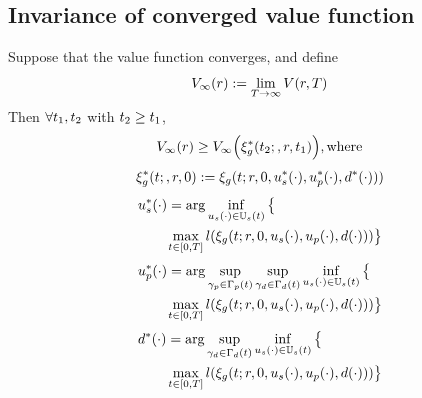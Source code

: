 \subsection{Invariance of converged value function}
 \begin{prop}
   \label{prop:main}
   Suppose that the value function converges, and define
      \begin{equation}
      \label{eq:conv_valfunc}
      V_\infty(r) := \lim_{T\rightarrow\infty}V(r, T)
      \end{equation}
   Then $\forall t_1, t_2$ with $t_2 \ge t_1$,
   \begin{equation}
   \label{eq:invariant}
   V_\infty(r) \ge V_\infty\Big(\xi_g^*(t_2;, r, t_1)\Big), \text{where}
   \end{equation}
   \begin{equation}
   \begin{aligned}
   \xi_g^*(t;, r, 0) := \xi_g(t; r, 0, u_s^*(\cdot), u_p^*(\cdot), d^*(\cdot))) \\
   \end{aligned}
   \end{equation}
   \begin{equation}
   \begin{aligned}
   &u_s^*(\cdot) = \arg \inf_{u_s(\cdot)\in\mathbb{U}_s(t)}\big\{\\
   & \qquad \max_{t \in [0, T]} l(\xi_g(t; r, 0, u_s(\cdot), u_p(\cdot), d(\cdot))) \big\}\\
    \end{aligned}
   \end{equation}
   \begin{equation}
   \begin{aligned}
   & u_p^*(\cdot) = \arg \sup_{\gamma_{p} \in \Gamma_p(t)} \sup_{\gamma_{d} \in \Gamma_d(t)} \inf_{u_s(\cdot) \in \mathbb{U}_s(t)} \big\{ \\
   & \qquad \max_{t \in [0, T]} l(\xi_g(t; r, 0, u_s(\cdot), u_p(\cdot), d(\cdot))) \big\} \\
    \end{aligned}
   \end{equation}
   \begin{equation}
   \begin{aligned}
   & d^*(\cdot) = \arg \sup_{\gamma_{d} \in \Gamma_d(t)} \inf_{u_s(\cdot) \in \mathbb{U}_s(t)} \big\{\\
   & \qquad \max_{t \in [0, T]} l(\xi_g(t; r, 0, u_s(\cdot), u_p(\cdot),  d(\cdot))) \big\}
   \end{aligned}
   \end{equation}
 \end{prop}

